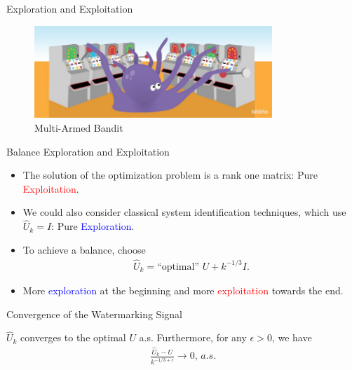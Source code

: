 \documentclass[10pt]{beamer}
\begin{document}
\begin{frame}{Exploration and Exploitation}
  \begin{figure}[ht]
    \centering
    \includegraphics[width=0.8\textwidth]{bandit.png}
    \caption{Multi-Armed Bandit}
  \end{figure}
\end{frame}

\begin{frame}{Balance Exploration and Exploitation}
  \begin{itemize}
  \item The solution of the optimization problem is a rank one matrix: Pure \textcolor{red}{Exploitation}.
  \item We could also consider classical system identification techniques, which use $\hat U_k=I$: Pure \textcolor{blue}{Exploration}.
  \item To achieve a balance, choose
    \begin{align*}
      \hat U_k = \text{``optimal'' } U + k^{-1/3} I.
    \end{align*}
  \item More \textcolor{blue}{exploration} at the beginning and more \textcolor{red}{exploitation} towards the end.
  \end{itemize}
\end{frame}

\begin{frame}{Convergence of the Watermarking Signal}
  \begin{theorem}
    $\hat U_k$ converges to the optimal $U$ a.s. Furthermore, for any $\epsilon > 0$, we have
    \begin{align*}
      \frac{\hat U_k - U}{k^{-1/3+\epsilon}} \rightarrow 0,\,a.s.
    \end{align*}
  \end{theorem}
\end{frame}
\end{document}
